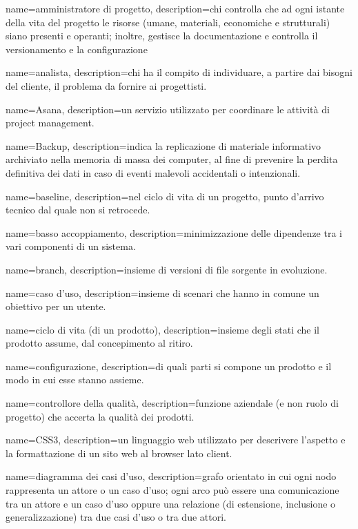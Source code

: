 {
name={amministratore di progetto},
description={chi controlla che ad ogni istante della vita del progetto le risorse (umane, materiali, economiche e strutturali) siano presenti e operanti; inoltre, gestisce la documentazione e controlla il versionamento e la configurazione}
}

{
name={analista},
description={chi ha il compito di individuare, a partire dai bisogni del cliente, il problema da fornire ai progettisti.}
}

{
name={Asana},
description={un servizio utilizzato per coordinare le attività di project management.
}
}

{
name={Backup},
description={indica la replicazione di materiale informativo archiviato nella memoria di massa dei computer, al ﬁne di prevenire la perdita deﬁnitiva dei dati in caso di eventi malevoli accidentali o intenzionali.}
}

{
name={baseline},
description={nel ciclo di vita di un progetto, punto d'arrivo tecnico dal quale non si retrocede.}
}

{
name={basso accoppiamento},
description={minimizzazione delle dipendenze tra i vari componenti di un sistema.}
}

{
name={branch},
description={insieme di versioni di file sorgente in evoluzione.}
}

{
name={caso d'uso},
description={insieme di scenari che hanno in comune un obiettivo per un utente.}
}

{
name={ciclo di vita (di un prodotto)},
description={insieme degli stati che il prodotto assume, dal concepimento al ritiro.}
}

{
name={configurazione},
description={di quali parti si compone un prodotto e il modo in cui esse stanno assieme.}
}

{
name={controllore della qualità},
description={funzione aziendale (e non ruolo di progetto) che accerta la qualità dei prodotti.}
}

{
name={CSS3},
description={un linguaggio web utilizzato per descrivere l'aspetto e la formattazione di un sito web al browser lato client.}
}

{
name={diagramma dei casi d'uso},
description={grafo orientato in cui ogni nodo rappresenta un attore o un caso d'uso; ogni arco può essere una comunicazione tra un attore e un caso d'uso oppure una relazione (di estensione, inclusione o generalizzazione) tra due casi d'uso o tra due attori.}
}

